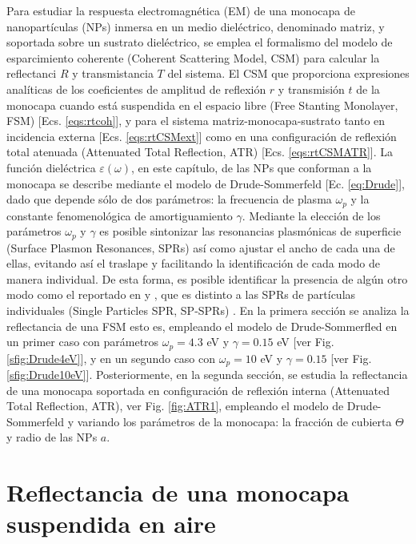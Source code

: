 Para estudiar la respuesta electromagnética (EM) de una monocapa de nanopartículas (NPs) inmersa en un medio dieléctrico, denominado matriz, y soportada sobre un sustrato dieléctrico, se emplea el formalismo del modelo de esparcimiento coherente (Coherent Scattering Model, CSM) para calcular la reflectanci $R$ y transmistancia $T$ del sistema. El CSM que proporciona expresiones analíticas de los coeficientes de amplitud de reflexión $r$ y transmisión $t$ de la monocapa cuando está suspendida en el espacio libre (Free Stanting Monolayer, FSM) [Ecs. \eqref{eqs:rtcoh}], y para el sistema matriz-monocapa-sustrato tanto en incidencia externa [Ecs. \eqref{eqs:rtCSMext}] como en una configuración de reflexión total atenuada  (Attenuated Total Reflection, ATR) [Ecs. \eqref{eqs:rtCSMATR}]. La función dieléctrica $\varepsilon(\omega)$, en este capítulo, de las NPs que conforman a la monocapa se describe mediante el modelo de Drude-Sommerfeld [Ec. \eqref{eq:Drude}], dado que depende sólo de dos parámetros: la frecuencia de plasma $\omega_p$ y la constante fenomenológica de amortiguamiento $\gamma$. Mediante la elección de los parámetros $\omega_p$ y $\gamma$ es posible sintonizar las resonancias plasmónicas de superficie (Surface Plasmon Resonances, SPRs) así como ajustar el ancho de cada una de ellas, evitando así el traslape y facilitando la identificación de cada modo de manera individual. De esta forma, es posible identificar la presencia de algún otro modo como el reportado en \cite{kabashin2009plasmonic} y \cite{danilov2018ultra}, que es distinto a las SPRs de partículas individuales (Single Particles SPR, SP-SPRs) .	En la primera sección se analiza la reflectancia de una FSM esto es, empleando el modelo de Drude-Sommerfled en un primer caso con parámetros $\omega_p = 4.3$ eV y  $\gamma = 0.15$ eV [ver Fig. \ref{sfig:Drude4eV}], y en un segundo caso con $\omega_p = 10$ eV y $\gamma = 0.15$  [ver Fig. \ref{sfig:Drude10eV}]. Posteriormente, en la segunda sección, se estudia la reflectancia de una monocapa soportada en configuración de reflexión interna (Attenuated Total Reflection, ATR), ver Fig. \ref{fig:ATR1}, empleando el modelo de Drude-Sommerfeld y variando los parámetros de la monocapa: la fracción de cubierta $\Theta$ y radio de las NPs $a$.
	
	\section{Reflectancia de una monocapa suspendida en aire}
	
